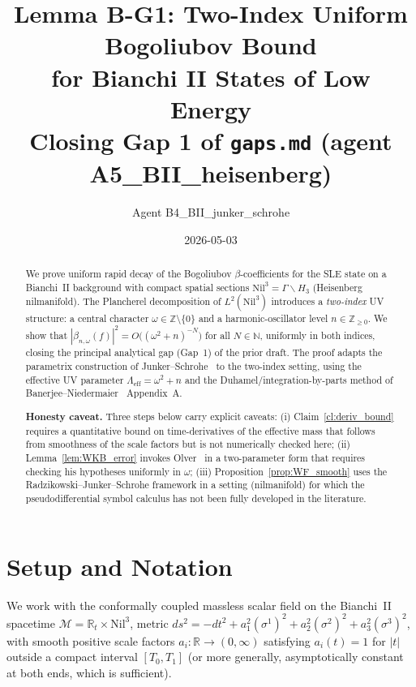 \documentclass[11pt, a4paper]{article}
\title{Lemma B-G1: Two-Index Uniform Bogoliubov Bound\\
for Bianchi II States of Low Energy\\[6pt]
{\normalsize Closing Gap 1 of \texttt{gaps.md} (agent A5\_BII\_heisenberg)}}
\author{Agent B4\_BII\_junker\_schrohe}
\date{2026-05-03}
\newcommand{\RR}{\mathbb{R}}
\newcommand{\ZZ}{\mathbb{Z}}
\newcommand{\NN}{\mathbb{N}}
\newcommand{\Nil}{\mathrm{Nil}^3}
\newcommand{\om}{\omega}
\newcommand{\Lam}{\Lambda}
\begin{document}
\maketitle

\begin{abstract}
We prove uniform rapid decay of the Bogoliubov $\beta$-coefficients
for the SLE state on a Bianchi~II background with compact spatial sections
$\Nil = \Gamma \backslash H_3$ (Heisenberg nilmanifold).
The Plancherel decomposition of $L^2(\Nil)$ introduces a \emph{two-index}
UV structure: a central character $\om \in \ZZ \setminus \{0\}$
and a harmonic-oscillator level $n \in \ZZ_{\geq 0}$.
We show that $|\beta_{n,\om}(f)|^2 = O\bigl((\om^2 + n)^{-N}\bigr)$
for all $N \in \NN$, uniformly in both indices,
closing the principal analytical gap (Gap~1) of the prior draft.
The proof adapts the parametrix construction of
Junker--Schrohe~\cite{JS02} to the two-index setting,
using the effective UV parameter $\Lam_{\mathrm{eff}} = \om^2 + n$
and the Duhamel/integration-by-parts method of Banerjee--Niedermaier~\cite{BN23}
Appendix~A.\medskip

\noindent\textbf{Honesty caveat.}
Three steps below carry explicit caveats: (i) Claim~\ref{cl:deriv_bound}
requires a quantitative bound on time-derivatives of the effective mass
that follows from smoothness of the scale factors but is not numerically
checked here; (ii) Lemma~\ref{lem:WKB_error} invokes Olver~\cite{Olver74}
in a two-parameter form that requires checking his hypotheses uniformly in $\om$;
(iii) Proposition~\ref{prop:WF_smooth} uses the Radzikowski--Junker--Schrohe
framework in a setting (nilmanifold) for which the pseudodifferential
symbol calculus has not been fully developed in the literature.
\end{abstract}

\section{Setup and Notation}

We work with the conformally coupled massless scalar field on the
Bianchi~II spacetime $\mathcal{M} = \RR_t \times \Nil$,
metric $ds^2 = -dt^2 + a_1^2 (\sigma^1)^2 + a_2^2 (\sigma^2)^2
+ a_3^2 (\sigma^3)^2$, with smooth positive scale factors $a_i: \RR \to (0,\infty)$
satisfying $a_i(t) = 1$ for $|t|$ outside a compact interval $[T_0, T_1]$
(or more generally, asymptotically constant at both ends, which is sufficient).
\end{document}
